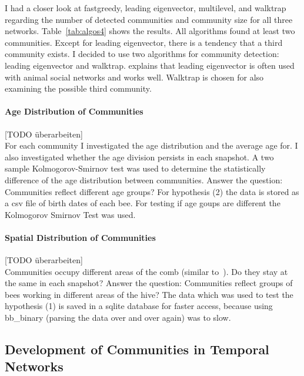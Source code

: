 I had a closer look at fastgreedy, leading eigenvector, multilevel, and walktrap regarding the number of detected communities and community size for all three networks. Table~\ref{tab:algos4} shows the results. All algorithms found at least two communities. Except for leading eigenvector, there is a tendency that a third community exists.
I decided to use two algorithms for community detection: leading eigenvector and walktrap. \textcite{farine2015constructing} explains that leading eigenvector is often used with animal social networks and works well. Walktrap is chosen for also  examining the possible third community.




\paragraph{Age Distribution of Communities}
[TODO überarbeiten]\\
For each community I investigated the age distribution and the average age for. I also investigated whether the age division persists in each snapshot. A two sample Kolmogorov-Smirnov test was used to determine the statistically difference of the age distribution between communities.
Answer the question: Communities reflect different age groups?
For hypothesis (2) the data is stored as a csv file of birth dates of each bee. For testing if age goups are different the Kolmogorov Smirnov Test was used.\\

\paragraph{Spatial Distribution of Communities}
[TODO überarbeiten]\\
Communities occupy different areas of the comb (similar to~\cite{baracchi2014socio}). Do they stay at the same in each snapshot?
Answer the question: Communities reflect groups of bees working in different areas of the hive? The data which was used to test the hypothesis (1) is saved in a sqlite database for faster access, because using bb\_binary (parsing the data over and over again) was to slow.\\

\subsection{Development of Communities in Temporal Networks}
\label{sec:bg:tracking}

